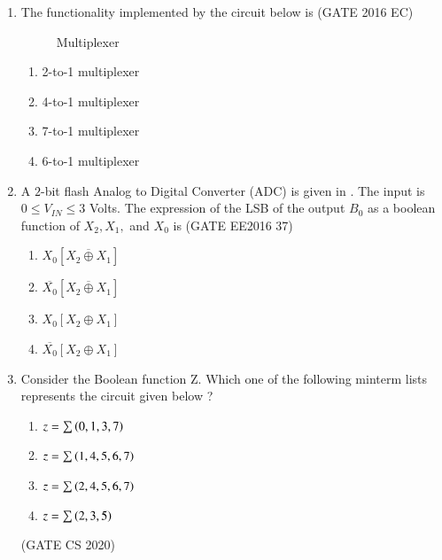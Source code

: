 \begin{enumerate}
\item The functionality implemented by the circuit below is \hfill{(GATE 2016 EC)}

\begin{figure}[H]
\centering

\label{fig:gate_ec_2016_43}
\caption{Multiplexer}
\end{figure}

\begin{enumerate}[label=\Alph*.]
\item 2-to-1 multiplexer
\item 4-to-1 multiplexer
\item 7-to-1 multiplexer
\item 6-to-1 multiplexer
\end{enumerate}
\item A $2$-bit flash Analog to Digital Converter (ADC) is given in . The input is $0 \leq V_{IN} \leq 3$ Volts. The expression of the LSB of the output $B_0$ as a boolean function of $X_2,X_1,$ and $X_0$ is \hfill(GATE EE2016 37)
\begin{figure}[H]
\centering

\caption{}
\label{EE2016_37_fig1}
\end{figure}
\begin{enumerate}
\item $X_0 \left[ \overline {X_2 \oplus X_1} \right]$
\item $\overline {X_0} \left[ \overline {X_2 \oplus X_1} \right]$
\item $X_0 \left[ X_2 \oplus X_1 \right]$
\item $\overline{X_0} \left[ X_2 \oplus X_1 \right]$
\end{enumerate}

\item Consider the Boolean function Z. Which one of the following minterm lists represents the 
 circuit given below ? 
 \\

\begin{enumerate}[label=\Alph*.]
 \item $z=\sum{\ensuremath{\left(0,1,3,7\right)}}$
 \item $z=\sum{\ensuremath{\left(1,4,5,6,7\right)}}$
 \item $z=\sum{\ensuremath{\left(2,4,5,6,7\right)}}$
 \item $z=\sum{\ensuremath{\left(2,3,5\right)}}$
\end{enumerate}
\hfill (GATE CS 2020)
\end{enumerate}


